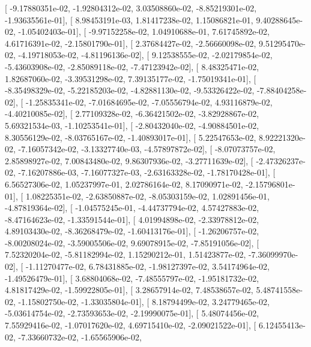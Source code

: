 \documentclass{article}
\begin{document}
       [ -9.17880351e-02,  -1.92804312e-02,   3.03508860e-02,
         -8.85219301e-02,  -1.93635561e-01],
       [  8.98453191e-03,   1.81417238e-02,   1.15086821e-01,
          9.40288645e-02,  -1.05402403e-01],
       [ -9.97152258e-02,   1.04910688e-01,   7.61745892e-02,
          4.61716391e-02,  -2.15801790e-01],
       [  2.37684427e-02,  -2.56660098e-02,   9.51295470e-02,
         -4.19718053e-02,  -4.81196136e-02],
       [  9.12538555e-02,  -2.02179854e-02,  -5.43603908e-02,
         -2.85089118e-02,  -7.47123942e-02],
       [  8.48325471e-02,   1.82687060e-02,  -3.39531298e-02,
          7.39135177e-02,  -1.75019341e-01],
       [ -8.35498329e-02,  -5.22185203e-02,  -4.82881130e-02,
         -9.53326422e-02,  -7.88404258e-02],
       [ -1.25835341e-02,  -7.01684695e-02,  -7.05556794e-02,
          4.93116879e-02,  -4.40210085e-02],
       [  2.77109328e-02,  -6.36421502e-02,  -3.82928867e-02,
          5.69321534e-03,  -1.10253541e-01],
       [ -2.80432040e-02,  -4.90884501e-02,   8.30556129e-02,
         -8.03765167e-02,  -1.40893017e-01],
       [  5.22547653e-02,   8.92221320e-02,  -7.16057342e-02,
         -3.13327740e-03,  -4.57897872e-02],
       [ -8.07073757e-02,   2.85898927e-02,   7.00843480e-02,
          9.86307936e-02,  -3.27711639e-02],
       [ -2.47326237e-02,  -7.16207886e-03,  -7.16077327e-03,
         -2.63163328e-02,  -1.78170428e-01],
       [  6.56527306e-02,   1.05237997e-01,   2.02786164e-02,
          8.17090971e-02,  -2.15796801e-01],
       [  1.08225351e-02,  -2.63850887e-02,  -8.05303159e-02,
          1.02891456e-01,  -4.87819364e-02],
       [ -1.04575245e-01,  -4.44737794e-02,   4.57427883e-02,
         -8.47164623e-02,  -1.33591544e-01],
       [  4.01994898e-02,  -2.33978812e-02,   4.89103430e-02,
         -8.36268479e-02,  -1.60413176e-01],
       [ -1.26206757e-02,  -8.00208024e-02,  -3.59005506e-02,
          9.69078915e-02,  -7.85191056e-02],
       [  7.52320204e-02,  -5.81182994e-02,   1.15290212e-01,
          1.51423877e-02,  -7.36099970e-02],
       [ -1.11270477e-02,   6.78431885e-02,  -1.98127397e-02,
          3.54174964e-02,  -1.49526479e-01],
       [  3.68804068e-02,  -7.48555797e-02,  -1.95181732e-02,
          4.81817429e-02,  -1.59922805e-01],
       [  3.28657914e-02,   7.48538657e-02,   5.48741558e-02,
         -1.15802750e-02,  -1.33035804e-01],
       [  8.18794499e-02,   3.24779465e-02,  -5.03614754e-02,
         -2.73593653e-02,  -2.19990075e-01],
       [  5.48074456e-02,   7.55929416e-02,  -1.07017620e-02,
          4.69715410e-02,  -2.09021522e-01],
       [  6.12455413e-02,  -7.33660732e-02,  -1.65565906e-02,
\end{document}
